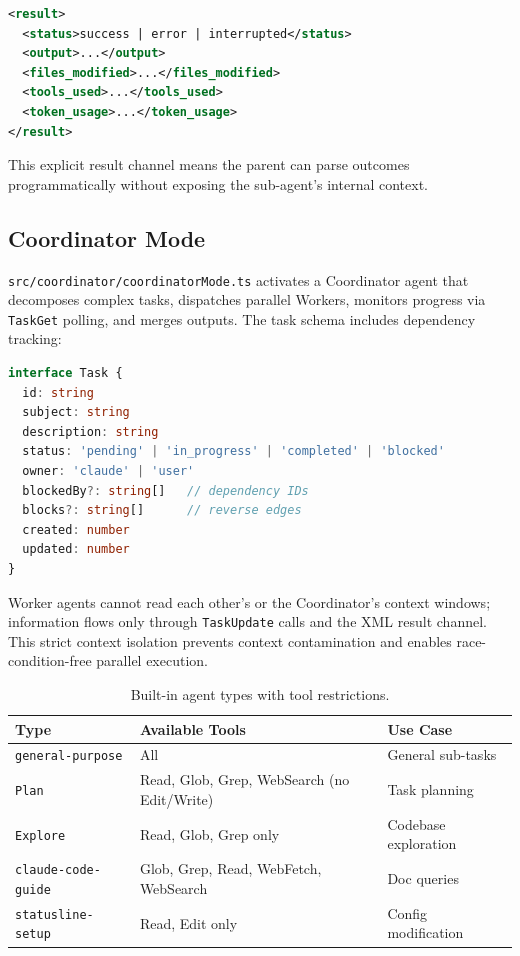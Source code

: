 \documentclass{article}
\newcommand{\file}[1]{\texttt{\small #1}}
\newcommand{\code}[1]{\texttt{#1}}
\begin{document}
\begin{lstlisting}[language=XML, caption={Sub-agent result XML protocol.}]
<result>
  <status>success | error | interrupted</status>
  <output>...</output>
  <files_modified>...</files_modified>
  <tools_used>...</tools_used>
  <token_usage>...</token_usage>
</result>
\end{lstlisting}

This explicit result channel means the parent can parse outcomes programmatically without exposing the sub-agent's internal context.

\subsection{Coordinator Mode}

\file{src/coordinator/coordinatorMode.ts} activates a Coordinator agent that decomposes complex tasks, dispatches parallel Workers, monitors progress via \code{TaskGet} polling, and merges outputs. The task schema includes dependency tracking:

\begin{lstlisting}[language=TypeScript, caption={Task schema with dependency graph in \texttt{Task.ts}.}]
interface Task {
  id: string
  subject: string
  description: string
  status: 'pending' | 'in_progress' | 'completed' | 'blocked'
  owner: 'claude' | 'user'
  blockedBy?: string[]   // dependency IDs
  blocks?: string[]      // reverse edges
  created: number
  updated: number
}
\end{lstlisting}

Worker agents cannot read each other's or the Coordinator's context windows; information flows only through \code{TaskUpdate} calls and the XML result channel. This strict context isolation prevents context contamination and enables race-condition-free parallel execution.

\begin{table}[t]
\centering
\caption{Built-in agent types with tool restrictions.}
\label{tab:agents}
\small
\begin{tabular}{lll}
\toprule
\textbf{Type} & \textbf{Available Tools} & \textbf{Use Case} \\
\midrule
\code{general-purpose} & All & General sub-tasks \\
\code{Plan}            & Read, Glob, Grep, WebSearch (no Edit/Write) & Task planning \\
\code{Explore}         & Read, Glob, Grep only & Codebase exploration \\
\code{claude-code-guide} & Glob, Grep, Read, WebFetch, WebSearch & Doc queries \\
\code{statusline-setup} & Read, Edit only & Config modification \\
\bottomrule
\end{tabular}
\end{table}
\end{document}
